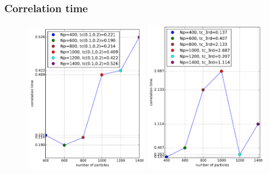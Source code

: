 \documentclass[slidestop, compress, mathserif]{beamer}
\begin{document}
\begin{frame}
  \frametitle<presentation>{Correlation time}
  \begin{figure}
    \centering
    \includegraphics[width=0.45\textwidth]{../check_tc1.pdf}
    \includegraphics[width=0.45\textwidth]{../check_tc2.pdf}
  \end{figure}
\end{frame}

\end{document}
